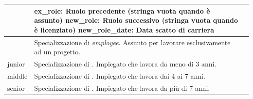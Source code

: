 \begin{longtable}{@{}| p{} | p{} | p{} |}
\begin{minipage}[t]{0.4\textwidth}
	                       \end{minipage}
	                     & \begin{minipage}[t]{0.3\textwidth}
		                       \raggedright
		                       \textbf{ex\_role}: Ruolo precedente (stringa vuota quando è assunto)\sskip
		                       \textbf{new\_role}: Ruolo successivo (stringa vuota quando è licenziato)\sskip
		                       \textbf{new\_role\_date}: Data scatto di carriera
	                       \end{minipage}                                      \\[90pt]
	\hline
	\projectsalaried     & \begin{minipage}[t]{0.4\textwidth}
		                       \raggedright
		                       Specializzazione di \textit{employee}. Assunto per lavorare esclusivamente ad un progetto.
	                       \end{minipage}
	                     &                                                                                                                    \\[25pt]
	\hline
	junior               & \begin{minipage}[t]{0.4\textwidth}
		                       \raggedright
		                       Specializzazione di \textit{\baseemp}. Impiegato che lavora da meno di 3 anni.
	                       \end{minipage}
	                     &                                                                                                                    \\[25pt]
	\hline
	middle               & \begin{minipage}[t]{0.4\textwidth}
		                       \raggedright
		                       Specializzazione di \textit{\baseemp}. Impiegato che lavora dai 4 ai 7 anni.
	                       \end{minipage}
	                     &                                                                                                                    \\[15pt]
	\hline
	senior               & \begin{minipage}[t]{0.4\textwidth}
		                       \raggedright
		                       Specializzazione di \textit{\baseemp}. Impiegato che lavora da più di 7 anni.
	                       \end{minipage}
	                     &                                                                                                                    \\[15pt]

\end{longtable}
